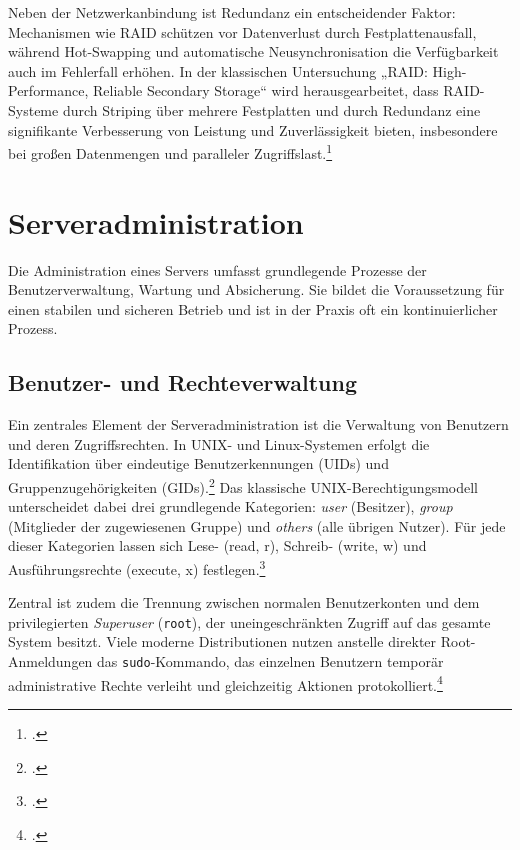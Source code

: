 \documentclass[12pt,a4paper]{report}
\begin{document}
  Neben der Netzwerkanbindung ist Redundanz ein entscheidender Faktor: Mechanismen 
  wie \ac{RAID} schützen vor Datenverlust durch 
  Festplattenausfall, während Hot-Swapping und automatische Neusynchronisation 
  die Verfügbarkeit auch im Fehlerfall erhöhen. In der klassischen Untersuchung „\ac{RAID}: 
  High-Performance, Reliable Secondary Storage“ wird herausgearbeitet, dass \ac{RAID}-Systeme durch Striping über mehrere Festplatten 
  und durch Redundanz eine signifikante Verbesserung von Leistung und Zuverlässigkeit bieten, insbesondere bei großen Datenmengen 
  und paralleler Zugriffslast.\footcite[Vgl.][151 ~ff.]{chen2004raid}

\section{Serveradministration}
Die Administration eines Servers umfasst grundlegende Prozesse der Benutzerverwaltung, Wartung und Absicherung. 
Sie bildet die Voraussetzung für einen stabilen und sicheren Betrieb und ist in der Praxis oft ein kontinuierlicher Prozess. %

  \subsection{Benutzer- und Rechteverwaltung}
  Ein zentrales Element der Serveradministration ist die Verwaltung von Benutzern und deren Zugriffsrechten. 
  In UNIX- und Linux-Systemen erfolgt die Identifikation über eindeutige Benutzerkennungen (\ac{UID}s) 
  und Gruppenzugehörigkeiten (\ac{GID}s).\footcite[Vgl.][S.~176~ff.]{nemeth_unixlinux}
  Das klassische UNIX-Berechtigungsmodell unterscheidet dabei drei grundlegende Kategorien: 
  \emph{user} (Besitzer), \emph{group} (Mitglieder der zugewiesenen Gruppe) und \emph{others} (alle übrigen Nutzer). 
  Für jede dieser Kategorien lassen sich Lese- (read, r), Schreib- (write, w) und Ausführungsrechte (execute, x) festlegen.\footcite[Vgl.]{wikipedia_dateisystemrechte}

  Zentral ist zudem die Trennung zwischen normalen Benutzerkonten und dem privilegierten \emph{Superuser} (\texttt{root}), 
  der uneingeschränkten Zugriff auf das gesamte System besitzt. 
  Viele moderne Distributionen nutzen anstelle direkter Root-Anmeldungen das \texttt{sudo}-Kommando, 
  das einzelnen Benutzern temporär administrative Rechte verleiht und gleichzeitig Aktionen protokolliert.\footcite[Vgl.][S.~112~ff.]{nemeth_unixlinux}
\end{document}
